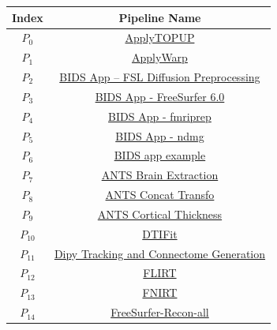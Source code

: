 




\begin{table}
    \centering
    \begin{tabular}{cc}
        \hline
        Index & Pipeline Name  \\
        \hline 
        $P_{0}$ & \href{https://doi.org/10.5281/zenodo.2621487}{ApplyTOPUP} \\
        $P_{1}$ & \href{https://doi.org/10.5281/zenodo.2650440}{ApplyWarp}\\
        $P_{2}$ & \href{https://doi.org/10.5281/zenodo.2566455}{BIDS App -- FSL Diffusion Preprocessing}\\
        $P_{3}$ & \href{https://doi.org/10.5281/zenodo.1484547}{BIDS App - FreeSurfer 6.0}\\
        $P_{4}$ & \href{https://doi.org/10.5281/zenodo.1895219}{BIDS App - fmriprep}\\
        $P_{5}$ & \href{https://doi.org/10.5281/zenodo.4457865}{BIDS App - ndmg}\\
        $P_{6}$ & \href{https://doi.org/10.5281/zenodo.1451001}{BIDS app example}\\
        $P_{7}$ & \href{https://doi.org/10.5281/zenodo.2636973}{ANTS Brain Extraction}\\
        $P_{8}$ & \href{https://doi.org/10.5281/zenodo.2640953}{ANTS Concat Transfo}\\
        $P_{9}$ & \href{https://doi.org/10.5281/zenodo.2634608}{ANTS Cortical Thickness}\\
        $P_{10}$ & \href{https://doi.org/10.5281/zenodo.2601876}{DTIFit}\\
        $P_{11}$ & \href{https://doi.org/10.5281/zenodo.3699595}{Dipy Tracking and Connectome Generation}\\
        $P_{12}$ & \href{https://doi.org/10.5281/zenodo.2597643}{FLIRT}	\\
        $P_{13}$ & \href{https://doi.org/10.5281/zenodo.2639849}{FNIRT}	\\
        $P_{14}$ & \href{https://doi.org/10.5281/zenodo.4043546}{FreeSurfer-Recon-all}\\

\end{tabular}
\end{table}
